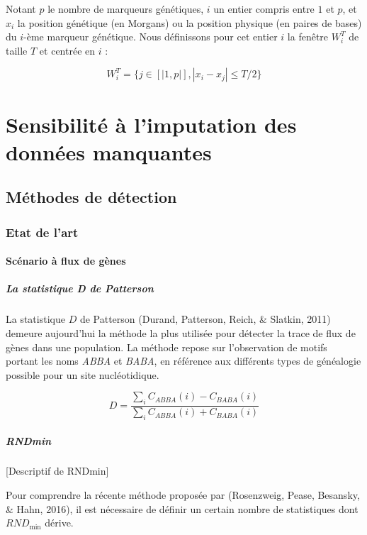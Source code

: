 \documentclass[12pt,a4paper,twoside]{ugathesis}
\theoremstyle{definition}
\theoremstyle{definition}
\theoremstyle{remark}
\begin{document}
Notant \(p\) le nombre de marqueurs génétiques, \(i\) un entier compris
entre \(1\) et \(p\), et \(x_i\) la position génétique (en Morgans) ou
la position physique (en paires de bases) du \(i\)-ème marqueur
génétique. Nous définissons pour cet entier \(i\) la fenêtre \(W_i^T\)
de taille \(T\) et centrée en \(i\) :

\[W_i^T = \{ j \in [|1, p|], |x_i - x_j| \leq T/2 \}\]

\section{Sensibilité à l'imputation des données
manquantes}\label{sensibilite-a-limputation-des-donnees-manquantes}

\newpage

\subsection{Méthodes de détection}\label{methodes-de-detection}

\subsubsection{Etat de l'art}\label{etat-de-lart-1}

\paragraph{Scénario à flux de gènes}\label{scenario-a-flux-de-genes}

\subparagraph{La statistique D de
Patterson}\label{la-statistique-d-de-patterson}

La statistique \(D\) de Patterson (Durand, Patterson, Reich, \& Slatkin,
2011) demeure aujourd'hui la méthode la plus utilisée pour détecter la
trace de flux de gènes dans une population. La méthode repose sur
l'observation de motifs portant les noms \emph{ABBA} et \emph{BABA}, en
référence aux différents types de généalogie possible pour un site
nucléotidique.

\[ D = \displaystyle \frac{\sum_i C_{ABBA}(i) - C_{BABA}(i)}{\sum_i C_{ABBA}(i) + C_{BABA}(i)} \]

\subparagraph{RNDmin}\label{rndmin}

{[}Descriptif de RNDmin{]}

Pour comprendre la récente méthode proposée par (Rosenzweig, Pease,
Besansky, \& Hahn, 2016), il est nécessaire de définir un certain nombre
de statistiques dont \(RND_{\text{min}}\) dérive.
\end{document}
